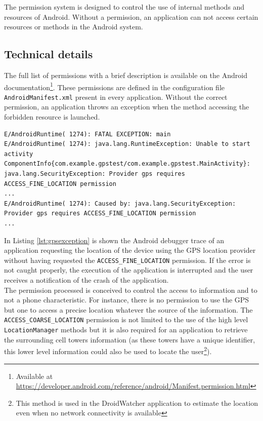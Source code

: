 The permission system is designed to control the use of internal methods and resources of Android.
Without a permission, an application can not access certain resources or methods in the Android system.

\subsection{Technical details}
The full list of permissions with a brief description is available on the Android documentation\footnote{Available at \url{https://developer.android.com/reference/android/Manifest.permission.html}}.
These permissions are defined in the configuration file \texttt{AndroidManifest.xml} present in every application.
Without the correct permission, an application throws an exception when the method accessing the forbidden resource is launched.

\begin{lstlisting}[breaklines,caption={Example of permission violation log},label={lst:gpsexception},numbers=none]
E/AndroidRuntime( 1274): FATAL EXCEPTION: main
E/AndroidRuntime( 1274): java.lang.RuntimeException: Unable to start activity ComponentInfo{com.example.gpstest/com.example.gpstest.MainActivity}: java.lang.SecurityException: Provider gps requires ACCESS_FINE_LOCATION permission
...
E/AndroidRuntime( 1274): Caused by: java.lang.SecurityException: Provider gps requires ACCESS_FINE_LOCATION permission
...
\end{lstlisting}

In Listing \ref{lst:gpsexception} is shown the Android debugger trace of an application requesting the location of the device using the GPS location provider without having requested the \texttt{ACCESS\_FINE\_LOCATION} permission.
If the error is not caught properly, the execution of the application is interrupted and the user receives a notification of the crash of the application.\\

The permission processed is conceived to control the access to information and to not a phone characteristic.
For instance, there is no permission to use the GPS but one to access a precise location whatever the source of the information.
The \texttt{ACCESS\_COARSE\_LOCATION} permission is not limited to the use of the high level \texttt{LocationManager} methods but it is also required for an application to retrieve the surrounding cell towers information (as these towers have a unique identifier, this lower level information could also be used to locate the user\footnote{This method is used in the DroidWatcher application to estimate the location even when no network connectivity is available}).

